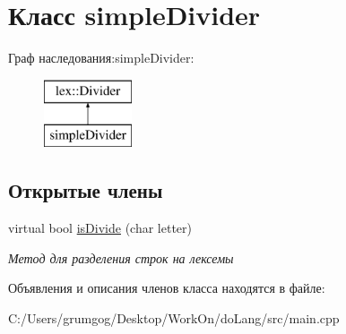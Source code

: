 \hypertarget{classsimple_divider}{}\section{Класс simple\+Divider}
\label{classsimple_divider}
Граф наследования\+:simple\+Divider\+:\begin{figure}[H]
\begin{center}
\leavevmode
\includegraphics[height=2.000000cm]{classsimple_divider}
\end{center}
\end{figure}
\subsection*{Открытые члены}
\begin{DoxyCompactItemize}
\item 
\mbox{\label{classsimple_divider_aa571e9a8bb1df785ac0f05ad16434241}} 
virtual bool \mbox{\hyperlink{classsimple_divider_aa571e9a8bb1df785ac0f05ad16434241}{is\+Divide}} (char letter)
\begin{DoxyCompactList}\small\item\em Метод для разделения строк на лексемы \end{DoxyCompactList}\end{DoxyCompactItemize}


Объявления и описания членов класса находятся в файле\+:\begin{DoxyCompactItemize}
\item 
C\+:/\+Users/grumgog/\+Desktop/\+Work\+On/do\+Lang/src/main.\+cpp\end{DoxyCompactItemize}
